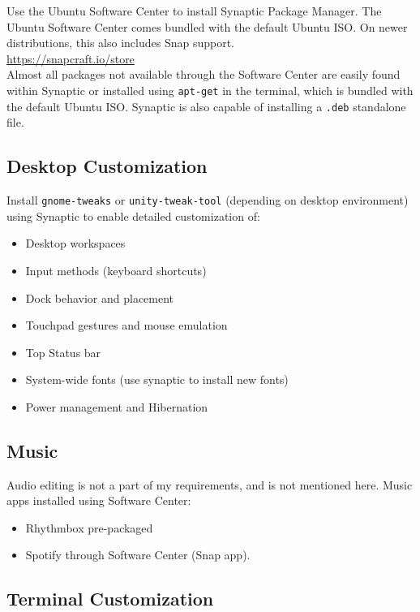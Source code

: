 \documentclass[10pt,letterpaper,twocolumn]{article}
\begin{document}
Use the Ubuntu Software Center to install Synaptic Package Manager. The Ubuntu Software Center comes bundled with the default Ubuntu ISO. On newer distributions, this also includes Snap support. \\

\url{https://snapcraft.io/store}\\

Almost all packages not available through the Software Center are easily found within Synaptic or installed using \texttt{apt-get} in the terminal, which is bundled with the default Ubuntu ISO. Synaptic is also capable of installing a \texttt{.deb} standalone file.

\subsection{Desktop Customization}
Install \texttt{gnome-tweaks} or \texttt{unity-tweak-tool} (depending on desktop environment) using Synaptic to enable detailed customization of:


\begin{itemize}
	\item Desktop workspaces 
	\item Input methods (keyboard shortcuts) 
	\item Dock behavior and placement
	\item Touchpad gestures and mouse emulation
	\item Top Status bar
	\item System-wide fonts (use synaptic to install new fonts) 
	\item Power management and Hibernation
\end{itemize}

\subsection{Music}

Audio editing is not a part of my requirements, and is not mentioned here.
Music apps installed using Software Center:

\begin{itemize}
	\item Rhythmbox pre-packaged
	\item Spotify through Software Center (Snap app).
\end{itemize}

\subsection{Terminal Customization}
\end{document}

